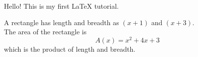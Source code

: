 \documentclass[11pt]{article}
\begin{document}
Hello! This is my first \LaTeX{} tutorial.

A rectangle has length and breadth as $(x+1)$ and $(x+3)$.\\
The area of the rectangle is $$A(x)=x^2+4x+3$$ which is the product of length and breadth.
\end{document}
